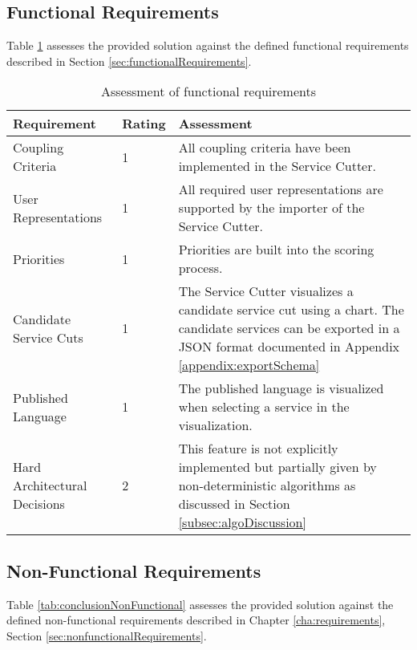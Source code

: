 \subsection{Functional Requirements}

Table \ref{tab:conclusionFunctional} assesses the provided solution against the defined functional requirements described in Section \ref{sec:functionalRequirements}.

\begin{table}[H]
	\centering
	\caption{Assessment of functional requirements}
	\label{tab:conclusionFunctional}
	\begin{tabular}{|p{100pt}|l|p{250pt}|}
	\hline \textbf{Requirement} & \textbf{Rating} & \textbf{Assessment} \\ 
	\hline Coupling Criteria & 1 & All coupling criteria have been implemented in the Service Cutter.  \\ 
	\hline User Representations & 1 & All required user representations are supported by the importer of the Service Cutter. \\ 
	\hline Priorities & 1 & Priorities are built into the scoring process. \\ 
	\hline Candidate Service Cuts & 1 & The Service Cutter visualizes a candidate service cut using a chart. The candidate services can be exported in a \gls{JSON} format documented in Appendix \ref{appendix:exportSchema} \\ 
	\hline Published Language & 1 & The published language is visualized when selecting a service in the visualization.  \\ 
	\hline Hard Architectural Decisions & 2 & This feature is not explicitly implemented but partially given by non-deterministic algorithms as discussed in Section \ref{subsec:algoDiscussion}\\
	\hline 
	\end{tabular} 
\end{table}

\clearpage
\subsection{Non-Functional Requirements}

Table \ref{tab:conclusionNonFunctional} assesses the provided solution against the defined non-functional requirements described in Chapter \ref{cha:requirements}, Section \ref{sec:nonfunctionalRequirements}. %

